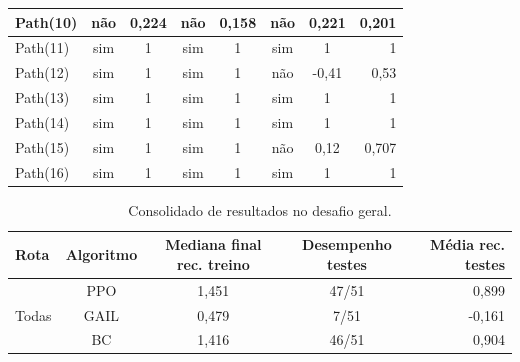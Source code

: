 \begin{table}[htpb]
\begin{tabular}{|l|c|c|c|c|c|c|r|}
            Path(10)  &      não        &   0,224         &    não          &      0,158    &    não          &      0,221    &      0,201             \\ \hline
            Path(11)  &      sim        &   1             &    sim          &      1        &    sim          &      1        &      1                 \\ \hline
            Path(12)  &      sim        &   1             &    sim          &      1        &    não          &      -0,41    &      0,53              \\ \hline
            Path(13)  &      sim        &   1             &    sim          &      1        &    sim          &      1        &      1                 \\ \hline
            Path(14)  &      sim        &   1             &    sim          &      1        &    sim          &      1        &      1                 \\ \hline
            Path(15)  &      sim        &   1             &    sim          &      1        &    não          &      0,12     &      0,707             \\ \hline
            Path(16)  &      sim        &   1             &    sim          &      1        &    sim          &      1        &      1                 \\ \hline
    \end{tabular}
\end{table}


\begin{table}[htpb]
    \centering
    \caption{Consolidado de resultados no desafio geral.}
    \label{resultado-tabela-desafio-geral}
    \begin{tabular}{|l|c|c|c|r|}
         \hline
         \small{Rota}           & \small{Algoritmo}   & \small{Mediana final rec. treino}  & \small{Desempenho testes}    & \small{Média rec. testes} \\ \hline
         \multirow{3}{*}{Todas} &      PPO            &   1,451                            &    47/51                     &      0,899                \\ \cline{2-5}
                                &      GAIL           &   0,479                            &    7/51                      &      -0,161               \\ \cline{2-5}
                                &      BC             &   1,416                            &    46/51                     &      0,904                \\ \hline
    \end{tabular}
\end{table}